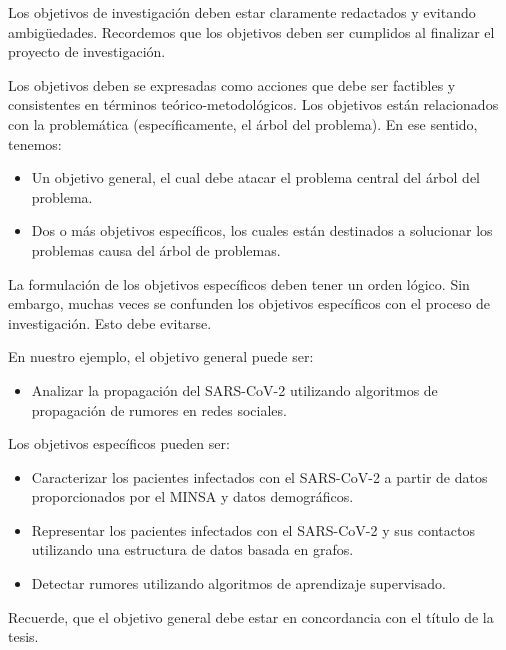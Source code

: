 Los objetivos de investigación deben estar claramente redactados y evitando ambigüedades. Recordemos que los objetivos deben ser cumplidos al finalizar el proyecto de investigación.

Los objetivos deben se expresadas como acciones que debe ser factibles y consistentes en términos teórico-metodológicos. Los objetivos están relacionados con la problemática (específicamente, el árbol del problema). En ese sentido, tenemos:

\begin{itemize}
\item Un objetivo general, el cual debe atacar el problema central del árbol del problema.
\item Dos o más objetivos específicos, los cuales están destinados a solucionar los problemas causa del árbol de problemas.
\end{itemize}

La formulación de los objetivos específicos deben tener un orden lógico. Sin embargo, muchas veces se confunden los objetivos específicos con el proceso de investigación. Esto debe evitarse. \\

\begin{tcolorbox}[colback=blue!5!white,colframe=blue!75!black,title=Ejemplo]
En nuestro ejemplo, el objetivo general puede ser:

\begin{itemize}
\item Analizar la propagación del SARS-CoV-2 utilizando algoritmos de propagación de rumores en redes sociales.
\end{itemize}

Los objetivos específicos pueden ser:

\begin{itemize}
\item Caracterizar los pacientes infectados con el SARS-CoV-2 a partir de datos proporcionados por el MINSA y datos demográficos.
\item Representar los pacientes infectados con el SARS-CoV-2 y sus contactos utilizando una estructura de datos basada en grafos.
\item Detectar rumores utilizando algoritmos de aprendizaje supervisado.
\end{itemize}
\end{tcolorbox}

Recuerde, que el objetivo general debe estar en concordancia con el título de la tesis.
